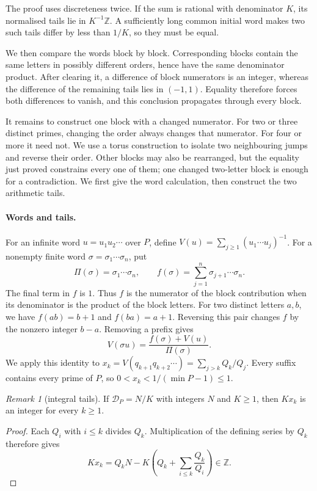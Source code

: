 \documentclass[11pt]{article}
\theoremstyle{remark}
\newtheorem{recordremark}[theorem]{Remark}
\renewenvironment{remark}[1][]{\begin{recordremark}[#1]}{\end{recordremark}}
\theoremstyle{plain}
\begin{document}
The proof uses discreteness twice. If the sum is rational with denominator
$K$, its normalised tails lie in $K^{-1}\mathbb Z$. A sufficiently long
common initial word makes two such tails differ by less than $1/K$, so
they must be equal.

We then compare the words block by block. Corresponding blocks contain
the same letters in possibly different orders, hence have the same
denominator product. After clearing it, a difference of block numerators
is an integer, whereas the difference of the remaining tails lies in
$(-1,1)$. Equality therefore forces both differences to vanish, and this
conclusion propagates through every block.

It remains to construct one block with a changed numerator. For two or
three distinct primes, changing the order always changes that numerator.
For four or more it need not. We use a torus construction to isolate two
neighbouring jumps and reverse their order. Other blocks may also be
rearranged, but the equality just proved constrains every one of them;
one changed two-letter block is enough for a contradiction. We first give
the word calculation, then construct the two arithmetic tails.

\paragraph{Words and tails.}\label{long269:sec:words}
For an infinite word $u=u_1u_2\cdots$ over $P$, define
$V(u)=\sum_{j\ge1}(u_1\cdots u_j)^{-1}$. For a nonempty finite word
$\sigma=\sigma_1\cdots\sigma_n$, put
\[
 \Pi(\sigma)=\sigma_1\cdots\sigma_n,\qquad
 f(\sigma)=\sum_{j=1}^{n}\sigma_{j+1}\cdots\sigma_n.
\]
The final term in $f$ is $1$. Thus $f$ is the numerator of the block
contribution when its denominator is the product of the block letters.
For two distinct letters $a,b$, we have $f(ab)=b+1$ and $f(ba)=a+1$.
Reversing this pair changes $f$ by the nonzero integer $b-a$.
Removing a prefix gives
\begin{equation}\label{long269:eq:word-shift}
 V(\sigma u)=\frac{f(\sigma)+V(u)}{\Pi(\sigma)}.
\end{equation}
We apply this identity to
$x_k=V(q_{k+1}q_{k+2}\cdots)=\sum_{j>k}Q_k/Q_j$.
Every suffix contains every prime of $P$, so
$0<x_k<1/(\min P-1)\le1$.

\begin{remark}[integral tails]\label{long269:res:dp-integral-tails}
If $\mathcal D_P=N/K$ with integers $N$ and $K\ge1$, then $Kx_k$ is an
integer for every $k\ge1$.
\end{remark}
\begin{proof}
Each $Q_i$ with $i\le k$ divides $Q_k$. Multiplication of the defining
series by $Q_k$ therefore gives
\[
 Kx_k=Q_kN-K\left(Q_k+\sum_{i\le k}\frac{Q_k}{Q_i}\right)\in\mathbb Z.
\]
\end{proof}
\end{document}

